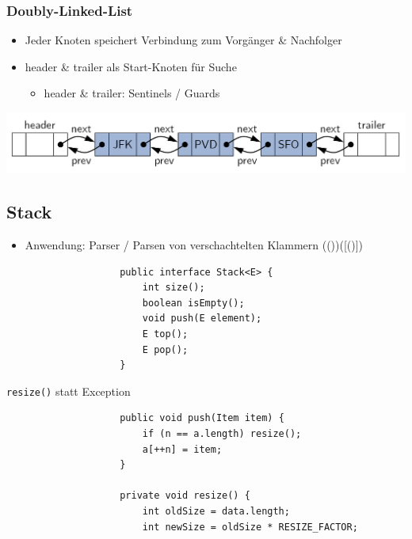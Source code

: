 \documentclass[a4paper, landscape, 8pt]{scrartcl}
\begin{document}
\begin{multicols*}{4}
                \subsubsection{Doubly-Linked-List}
                    \begin{itemize}
                        \item Jeder Knoten speichert Verbindung zum Vorgänger \& Nachfolger
                        \item header \& trailer als Start-Knoten für Suche
                        \begin{itemize}
                            \item header \& trailer: Sentinels / Guards
                        \end{itemize}
                    \end{itemize}
                    \includegraphics[scale=0.2,width=\columnwidth]{graphic/02_doubly-linkedlist}

        \subsection{Stack}
            \begin{itemize}
                \item Anwendung: Parser / Parsen von verschachtelten Klammern (())([()])
            \end{itemize}
            \begin{lstlisting}
                    public interface Stack<E> {
                        int size();
                        boolean isEmpty();
                        void push(E element);
                        E top();
                        E pop();
                    }
            \end{lstlisting}
            \texttt{resize()} statt Exception
            \begin{lstlisting}
                    public void push(Item item) {
                        if (n == a.length) resize();
                        a[++n] = item;
                    }

                    private void resize() {
                        int oldSize = data.length;
                        int newSize = oldSize * RESIZE_FACTOR;


\end{lstlisting}
\end{multicols*}
\end{document}
